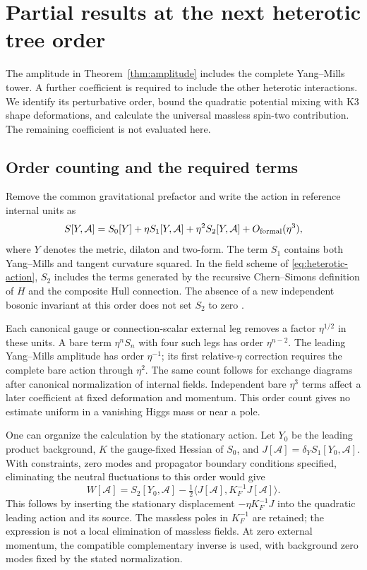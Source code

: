 \section{Partial results at the next heterotic tree order}\label{sec:nexttree}

The amplitude in Theorem~\ref{thm:amplitude} includes the complete
Yang--Mills tower. A further coefficient is required to include the
other heterotic interactions. We identify its perturbative order, bound
the quadratic potential mixing with K3 shape deformations, and calculate
the universal massless spin-two contribution. The remaining
coefficient is not evaluated here.

\subsection{Order counting and the required terms}
Remove the common gravitational prefactor and write the action in
reference internal units as
\begin{equation}\label{eq:treeorders}
 S[Y,\mathcal A]=S_0[Y]+\eta S_1[Y,\mathcal A]
             +\eta^2 S_2[Y,\mathcal A]+O_{\mathrm{formal}}(\eta^3),
\end{equation}
where $Y$ denotes the metric, dilaton and two-form. The term $S_1$
contains both Yang--Mills and tangent curvature squared. In the field
scheme of \eqref{eq:heterotic-action}, $S_2$ includes the terms generated
by the recursive Chern--Simons definition of $H$ and the composite
Hull connection. The absence of a new independent bosonic invariant
at this order does not set $S_2$ to zero
\cite[section~3.1]{aqs}\cite[section~2.1]{mcorist_yin,mcorist_picard}.

Each canonical gauge or connection-scalar external leg removes a factor
$\eta^{1/2}$ in these units. A bare term $\eta^nS_n$ with four such
legs has order $\eta^{n-2}$. The leading Yang--Mills amplitude has
order $\eta^{-1}$; its first relative-$\eta$ correction requires the
complete bare action through $\eta^2$. The same count follows for
exchange diagrams after canonical normalization of internal fields.
Independent bare $\eta^3$ terms affect a later coefficient at fixed
deformation and momentum. This order count gives no estimate uniform
in a vanishing Higgs mass or near a pole.

One can organize the calculation by the stationary action. Let $Y_0$
be the leading product background, $K$ the gauge-fixed Hessian of $S_0$,
and $J[\mathcal A]=\delta_Y S_1[Y_0,\mathcal A]$. With constraints,
zero modes and propagator boundary conditions specified, eliminating
the neutral fluctuations to this order would give
\begin{equation}\label{eq:stationarycorrection}
 W[\mathcal A]=S_2[Y_0,\mathcal A]
       -\tfrac12\langle J[\mathcal A],K_F^{-1}J[\mathcal A]\rangle.
\end{equation}
This follows by inserting the stationary displacement
$-\eta K_F^{-1}J$ into the quadratic leading action and its source.
The massless poles in $K_F^{-1}$ are retained; the expression is not
a local elimination of massless fields. At zero external momentum,
the compatible complementary inverse is used, with background zero
modes fixed by the stated normalization.

